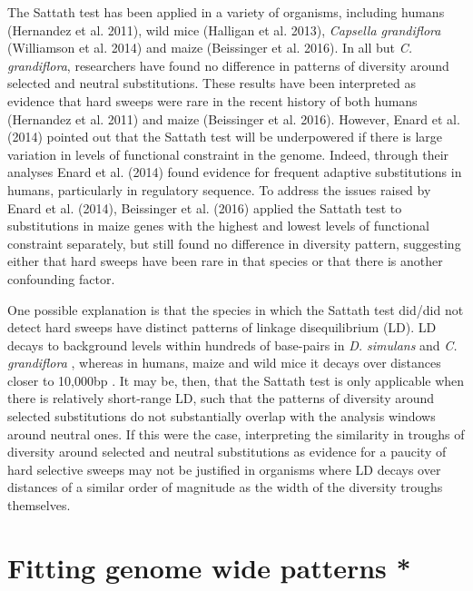 The Sattath test has been applied in a variety of organisms, including humans (Hernandez et al. 2011), wild mice (Halligan et al. 2013), \textit{Capsella grandiflora} (Williamson et al. 2014) and maize (Beissinger et al. 2016). In all but \textit{C. grandiflora}, researchers have found no difference in patterns of diversity around selected and neutral substitutions. These results have been interpreted as evidence that hard sweeps were rare in the recent history of both humans (Hernandez et al. 2011) and maize (Beissinger et al. 2016). However, Enard et al. (2014) pointed out that the Sattath test will be underpowered if there is large variation in levels of functional constraint in the genome. Indeed, through their analyses Enard et al. (2014) found evidence for frequent adaptive substitutions in humans, particularly in regulatory sequence. To address the issues raised by Enard et al. (2014), Beissinger et al. (2016) applied the Sattath test to substitutions in maize genes with the highest and lowest levels of functional constraint separately, but still found no difference in diversity pattern, suggesting either that hard sweeps have been rare in that species or that there is another confounding factor.
 
One possible explanation is that the species in which the Sattath test did/did not detect hard sweeps have distinct patterns of linkage disequilibrium (LD). LD decays to background levels within hundreds of base-pairs in \textit{D. simulans} \citep{RN283} and \textit{C. grandiflora} \citep{RN271}, whereas in humans, maize and wild mice it decays over distances closer to 10,000bp \citep{RN273,RN327, RN272}. It may be, then, that the Sattath test is only applicable when there is relatively short-range LD, such that the patterns of diversity around selected substitutions do not substantially overlap with the analysis windows around neutral ones. If this were the case, interpreting the similarity in troughs of diversity around selected and neutral substitutions as evidence for a paucity of hard selective sweeps may not be justified in organisms where LD decays over distances of a similar order of magnitude as the width of the diversity troughs themselves.
   	        	  
\section[Fitting genome wide patterns]{Fitting genome wide patterns *}

